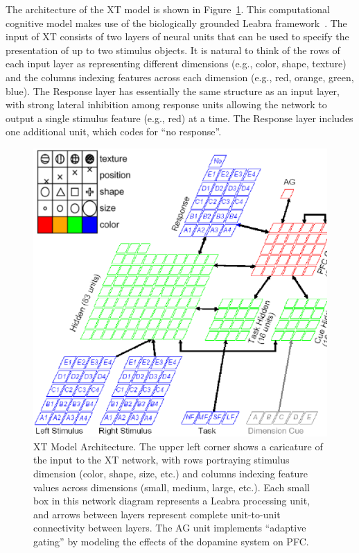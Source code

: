 The architecture of the XT model is shown in Figure~\ref{xt-layout-figure}.  This computational cognitive model makes use of the biologically grounded Leabra framework~\cite{OReillyRC:2000:Computational}.  The input of XT consists of two layers of neural units that can be used to specify the presentation of up to two stimulus objects.  It is natural to think of the rows of each input layer as representing different dimensions (e.g., color, shape, texture) and the columns indexing features across each dimension (e.g., red, orange, green, blue).  The Response layer has essentially the same structure as an input layer, with strong lateral inhibition among response units allowing the network to output a single stimulus feature (e.g., red) at a time.  The Response layer includes one additional unit, which codes for ``no response''.  

\begin{figure}
\begin{center}
	\includegraphics[width=125mm]{figures/xt_arch_2.ps}
\end{center}
\caption{XT Model Architecture.  The upper left corner shows a
         caricature of the input to the XT network, with rows
         portraying stimulus dimension (color, shape, size, etc.) and
         columns indexing feature values across dimensions (small,
         medium, large, etc.).  Each small box in this network diagram represents a Leabra processing unit, and arrows between layers represent complete unit-to-unit connectivity between layers.  The AG unit implements ``adaptive gating'' by modeling the effects of the dopamine system on PFC.}
\label{xt-layout-figure}
\end{figure} 

